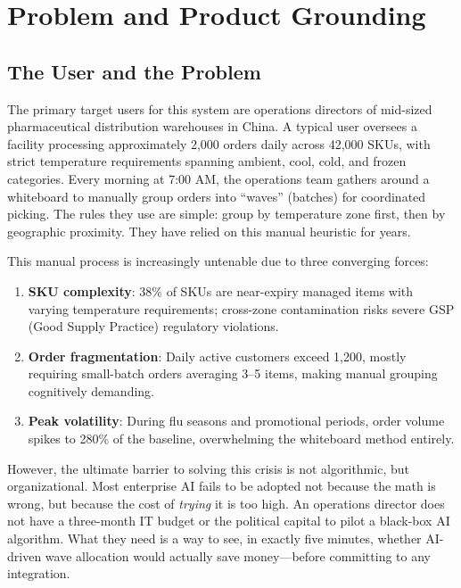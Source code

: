 
\section{Problem and Product Grounding}

\subsection{The User and the Problem}

The primary target users for this system are operations directors of mid-sized pharmaceutical distribution warehouses in China. A typical user oversees a facility processing approximately 2,000 orders daily across 42,000 SKUs, with strict temperature requirements spanning ambient, cool, cold, and frozen categories. Every morning at 7:00 AM, the operations team gathers around a whiteboard to manually group orders into ``waves'' (batches) for coordinated picking. The rules they use are simple: group by temperature zone first, then by geographic proximity. They have relied on this manual heuristic for years.

This manual process is increasingly untenable due to three converging forces:

\begin{enumerate}
    \item \textbf{SKU complexity}: 38\% of SKUs are near-expiry managed items with varying temperature requirements; cross-zone contamination risks severe GSP (Good Supply Practice) regulatory violations\parencite{paxafe2025ai}.
    \item \textbf{Order fragmentation}: Daily active customers exceed 1,200, mostly requiring small-batch orders averaging 3--5 items, making manual grouping cognitively demanding.
    \item \textbf{Peak volatility}: During flu seasons and promotional periods, order volume spikes to 280\% of the baseline, overwhelming the whiteboard method entirely.
\end{enumerate}

However, the ultimate barrier to solving this crisis is not algorithmic, but organizational. Most enterprise AI fails to be adopted not because the math is wrong, but because the cost of \textit{trying} it is too high. An operations director does not have a three-month IT budget or the political capital to pilot a black-box AI algorithm. What they need is a way to see, in exactly five minutes, whether AI-driven wave allocation would actually save money---before committing to any integration.

